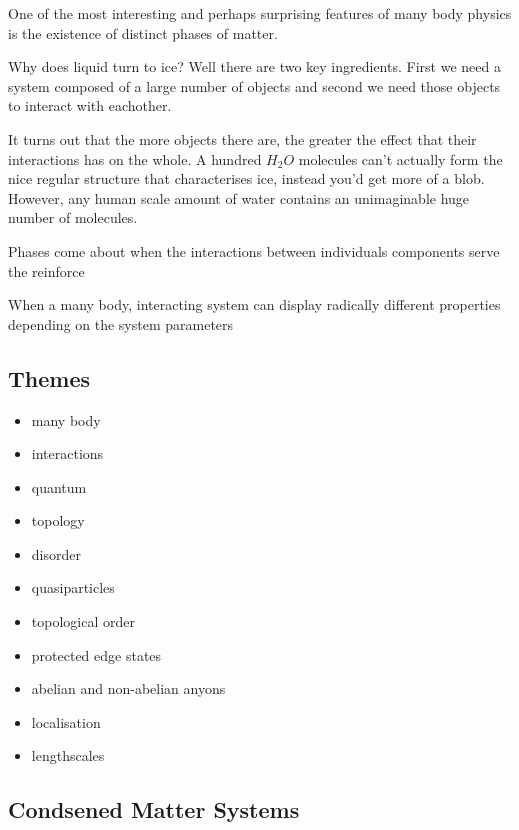 \begin{Shaded}
\begin{Highlighting}[]
\OperatorTok{\%\%}
\end{Highlighting}
\end{Shaded}

One of the most interesting and perhaps surprising features of many body physics is the existence of distinct phases of matter.

Why does liquid turn to ice? Well there are two key ingredients. First we need a system composed of a large number of objects and second we need those objects to interact with eachother.

It turns out that the more objects there are, the greater the effect that their interactions has on the whole. A hundred \(H_2O\) molecules can't actually form the nice regular structure that characterises ice, instead you'd get more of a blob. However, any human scale amount of water contains an unimaginable huge number of molecules.

Phases come about when the interactions between individuals components serve the reinforce

When a many body, interacting system can display radically different properties depending on the system parameters

\hypertarget{themes}{%
\subsection{Themes}\label{themes}}

\begin{itemize}
\item
  many body
\item
  interactions
\item
  quantum
\item
  topology
\item
  disorder
\item
  quasiparticles
\item
  topological order
\item
  protected edge states
\item
  abelian and non-abelian anyons
\item
  localisation
\item
  lengthscales
\end{itemize}

\hypertarget{condsened-matter-systems}{%
\subsection{Condsened Matter Systems}\label{condsened-matter-systems}}

